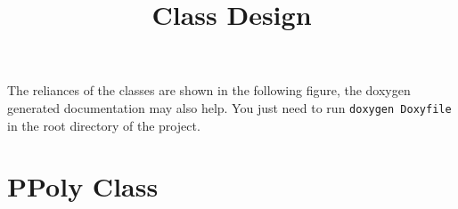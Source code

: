 \documentclass[a4paper]{article}
\begin{document}
\title{Class Design}
\maketitle
\tableofcontents

\newpage

The reliances of the classes are shown in the following figure, the doxygen generated documentation may also help. You just need to run \texttt{doxygen Doxyfile} in the root directory of the project.

\section{PPoly Class}
\end{document}
